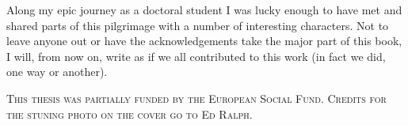 








\begin{acknowledgements}
  Along my epic journey as a doctoral student I was lucky enough to have met and shared parts of this pilgrimage with a number of interesting characters. Not to leave anyone out or have the acknowledgements take the major part of this book, I will, from now on, write as if we all contributed to this work (in fact we did, one way or another).
\end{acknowledgements}

\vfill

\begin{center}
  \textsc{This thesis was partially funded by the European Social Fund.}
  \vspace{.2cm}
  \textsc{Credits for the stuning photo on the cover go to Ed Ralph.}
\end{center}